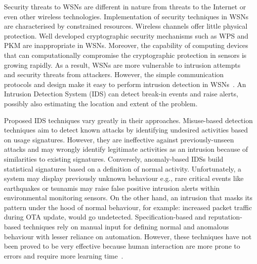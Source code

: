 \documentclass{CRPITStyle}
\renewcommand{\cite}{\citep}
\begin{document}
Security threats to WSNs are different in nature from threats to the Internet or even other wireless technologies. %
Implementation of security techniques in WSNs are characterised by constrained resources.
Wireless channels offer little physical protection.
Well developed cryptographic security mechanisms such as WPS and PKM are inappropriate in WSNs.
Moreover, the capability of computing devices that can computationally compromise the cryptographic protection in sensors is growing rapidly.
As a result, WSNs are more vulnerable to intrusion attempts and security threats from attackers.
However, the simple communication protocols and design make it easy to perform intrusion detection in WSNs~\cite{quing09}.
An Intrusion Detection System (IDS) can detect  break-in events and raise alerts, possibly also estimating the location and extent of the problem. %


Proposed IDS techniques vary greatly in their approaches.
Misuse-based  detection  techniques aim to detect known attacks by identifying undesired activities based on usage signatures.
However, they are ineffective against previously-unseen attacks and 
may wrongly identify legitimate activities as an intrusion because of similarities to existing signatures.
Conversely, anomaly-based IDSs build statistical signatures based on a definition of normal activity.
Unfortunately, a system may display previously unknown behaviour e.g., rare critical events like earthquakes or tsunamis may raise false positive intrusion alerts within environmental monitoring sensors.
On the other hand, an intrusion that masks its pattern under the hood of normal behaviour, for example: increased packet traffic during OTA update, would go undetected.
Specification-based and reputation-based techniques rely on manual input for defining normal and anomalous behaviour with lesser reliance on automation.
However, these techniques have not been proved to be very effective because human interaction are more prone to errors and require more learning time~\cite{quing09, 1593102, 1290173, Chen:2009:NMI:1516241.1516282}. 
\end{document}
